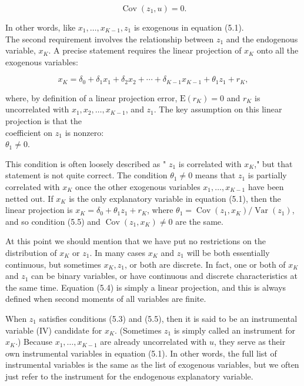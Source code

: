 \documentclass[10pt]{article}
\begin{document}
\begin{equation*}
\operatorname{Cov}\left(z_{1}, u\right)=0 . \tag{5.3}
\end{equation*}


In other words, like $x_{1}, \ldots, x_{K-1}, z_{1}$ is exogenous in equation (5.1).\\
The second requirement involves the relationship between $z_{1}$ and the endogenous variable, $x_{K}$. A precise statement requires the linear projection of $x_{K}$ onto all the exogenous variables:


\begin{equation*}
x_{K}=\delta_{0}+\delta_{1} x_{1}+\delta_{2} x_{2}+\cdots+\delta_{K-1} x_{K-1}+\theta_{1} z_{1}+r_{K}, \tag{5.4}
\end{equation*}


where, by definition of a linear projection error, $\mathrm{E}\left(r_{K}\right)=0$ and $r_{K}$ is uncorrelated with $x_{1}, x_{2}, \ldots, x_{K-1}$, and $z_{1}$. The key assumption on this linear projection is that the\\
coefficient on $z_{1}$ is nonzero:\\
$\theta_{1} \neq 0$.

This condition is often loosely described as " $z_{1}$ is correlated with $x_{K}$," but that statement is not quite correct. The condition $\theta_{1} \neq 0$ means that $z_{1}$ is partially correlated with $x_{K}$ once the other exogenous variables $x_{1}, \ldots, x_{K-1}$ have been netted out. If $x_{K}$ is the only explanatory variable in equation (5.1), then the linear projection is $x_{K}=\delta_{0}+\theta_{1} z_{1}+r_{K}$, where $\theta_{1}=\operatorname{Cov}\left(z_{1}, x_{K}\right) / \operatorname{Var}\left(z_{1}\right)$, and so condition (5.5) and $\operatorname{Cov}\left(z_{1}, x_{K}\right) \neq 0$ are the same.

At this point we should mention that we have put no restrictions on the distribution of $x_{K}$ or $z_{1}$. In many cases $x_{K}$ and $z_{1}$ will be both essentially continuous, but sometimes $x_{K}, z_{1}$, or both are discrete. In fact, one or both of $x_{K}$ and $z_{1}$ can be binary variables, or have continuous and discrete characteristics at the same time. Equation (5.4) is simply a linear projection, and this is always defined when second moments of all variables are finite.

When $z_{1}$ satisfies conditions (5.3) and (5.5), then it is said to be an instrumental variable (IV) candidate for $x_{K}$. (Sometimes $z_{1}$ is simply called an instrument for $x_{K}$.) Because $x_{1}, \ldots, x_{K-1}$ are already uncorrelated with $u$, they serve as their own instrumental variables in equation (5.1). In other words, the full list of instrumental variables is the same as the list of exogenous variables, but we often just refer to the instrument for the endogenous explanatory variable.
\end{document}
